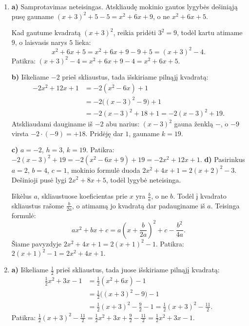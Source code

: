 \documentclass[12pt,a4paper]{article}
\begin{document}
\begin{enumerate}
Bendruoju atveju $-2(x-h)^2+k=-2x^2+4hx-2h^2+k$. Pagal tą pačią išvadą prilyginę atitinkamus koeficientus gauname $4h=12$ ir $-2h^2+k=-1$. Todėl $h=3$, $k=-1+18=17$. Kitos poros nėra.

\textbf{c)} Pagal 15 uždavinį $h=-\frac b{2a}$ ir $k=c-\frac{b^2}{4a}$. Įrodome vienatinumą: atskliaudę gauname
\[
a(x-h)^2+k=ax^2-2ahx+ah^2+k.
\]
Prilyginę koeficientus turime $-2ah=b$ ir $ah^2+k=c$. Kadangi $a\ne0$, pirmoji lygybė vienareikšmiškai nustato $h=-\frac b{2a}$. Tuomet antroji vienareikšmiškai nustato $k=c-ah^2=c-\frac{b^2}{4a}$. Vadinasi, kitų porų nėra.
\item \textbf{a)} Samprotavimas neteisingas. Atskliaudę mokinio gautos lygybės dešiniąją pusę gauname $(x+3)^2+5-5=x^2+6x+9$, o ne $x^2+6x+5$.

Kad gautume kvadratą $(x+3)^2$, reikia pridėti $3^2=9$, todėl kartu atimame $9$, o laisvasis narys $5$ lieka:
\[
x^2+6x+5=x^2+6x+9-9+5=(x+3)^2-4.
\]
Patikra: $(x+3)^2-4=x^2+6x+9-4=x^2+6x+5$.

\textbf{b)} Iškeliame $-2$ prieš skliaustus, tada išskiriame pilnąjį kvadratą:
\[
\begin{aligned}
-2x^2+12x+1&=-2(x^2-6x)+1\\
&=-2\bigl((x-3)^2-9\bigr)+1\\
&=-2(x-3)^2+18+1=-2(x-3)^2+19.
\end{aligned}
\]
Atskliaudami dauginame iš $-2$ abu narius: $(x-3)^2$ gauna ženklą $-$, o $-9$ virsta $-2\cdot(-9)=+18$. Pridėję dar $1$, gauname $k=19$.

\textbf{c)} $a=-2$, $h=3$, $k=19$. Patikra: $-2(x-3)^2+19=-2(x^2-6x+9)+19=-2x^2+12x+1$.
\textbf{d)} Pasirinkus $a=2$, $b=4$, $c=1$, mokinio formulė duoda $2x^2+4x+1=2(x+2)^2-3$. Dešinioji pusė lygi $2x^2+8x+5$, todėl lygybė neteisinga.

Iškėlus $a$, skliaustuose koeficientas prie $x$ yra $\frac ba$, o ne $b$. Todėl į kvadrato skliaustus rašome $\frac b{2a}$, o atimamą jo kvadratą dar padauginame iš $a$. Teisinga formulė:
\[
ax^2+bx+c=a\left(x+\frac b{2a}\right)^2+c-\frac{b^2}{4a}.
\]
Šiame pavyzdyje $2x^2+4x+1=2(x+1)^2-1$. Patikra: $2(x+1)^2-1=2x^2+4x+1$.
\item \textbf{a)} Iškeliame $\frac12$ prieš skliaustus, tada juose išskiriame pilnąjį kvadratą:
\[
\begin{aligned}
\frac12x^2+3x-1&=\frac12(x^2+6x)-1\\
&=\frac12\bigl((x+3)^2-9\bigr)-1\\
&=\frac12(x+3)^2-\frac92-1
=\frac12(x+3)^2-\frac{11}{2}.
\end{aligned}
\]
Patikra: $\frac12(x+3)^2-\frac{11}{2}=\frac12x^2+3x+\frac92-\frac{11}{2}=\frac12x^2+3x-1$.


\end{enumerate}
\end{document}
